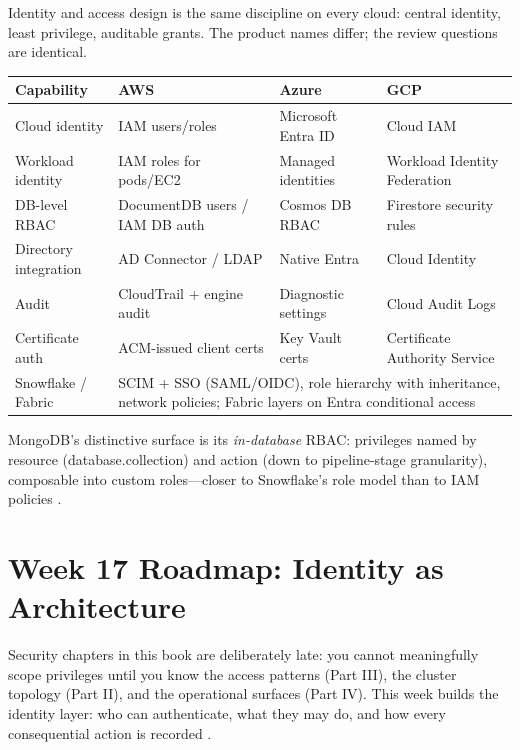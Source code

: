 \begin{crosscloud}
Identity and access design is the same discipline on every cloud: central identity, least privilege, auditable grants. The product names differ; the review questions are identical.

\vspace{2mm}
{\footnotesize
\begin{tabular}{@{}p{2.9cm}p{3.0cm}p{3.0cm}p{3.0cm}@{}} 
\toprule
\textbf{Capability} & \textbf{AWS} & \textbf{Azure} & \textbf{GCP} \\
\midrule
Cloud identity & IAM users/roles & Microsoft Entra ID & Cloud IAM \\
Workload identity & IAM roles for pods/EC2 & Managed identities & Workload Identity Federation \\
DB-level RBAC & DocumentDB users / IAM DB auth & Cosmos DB RBAC & Firestore security rules \\
Directory integration & AD Connector / LDAP & Native Entra & Cloud Identity \\
Audit & CloudTrail + engine audit & Diagnostic settings & Cloud Audit Logs \\
Certificate auth & ACM-issued client certs & Key Vault certs & Certificate Authority Service \\
\addlinespace
Snowflake / Fabric & \multicolumn{3}{l}{SCIM + SSO (SAML/OIDC), role hierarchy with inheritance, network policies; Fabric layers on Entra conditional access} \\
\bottomrule
\end{tabular}}

\vspace{1mm}
MongoDB's distinctive surface is its \emph{in-database} RBAC: privileges named by resource (database.collection) and action (down to pipeline-stage granularity), composable into custom roles---closer to Snowflake's role model than to IAM policies \cite{mongodbSecurityChecklistDocs,mongodbRBACDocs}.
\end{crosscloud}

\section{Week 17 Roadmap: Identity as Architecture}
Security chapters in this book are deliberately late: you cannot meaningfully scope privileges until you know the access patterns (Part III), the cluster topology (Part II), and the operational surfaces (Part IV). This week builds the identity layer: who can authenticate, what they may do, and how every consequential action is recorded \cite{mongodbSecurityChecklistDocs}.

